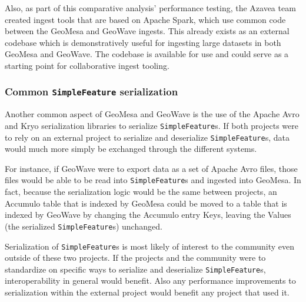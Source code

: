 Also, as part of this comparative analysis' performance testing, the Azavea team created ingest tools that are based on Apache Spark, which use common code between the GeoMesa and GeoWave ingests.
This already exists as an external codebase which is demonstratively useful for ingesting large datasets in both GeoMesa and GeoWave.
The codebase is available for use and could serve as a starting point for collaborative ingest tooling.


\subsubsection{Common \texttt{SimpleFeature} serialization}
\label{sec:conclusions:collaboration:serialization}

Another common aspect of GeoMesa and GeoWave is the use of the Apache Avro and Kryo serialization libraries to serialize \texttt{SimpleFeature}s.
If both projects were to rely on an external project to serialize and deserialize \texttt{SimpleFeature}s, data would much more simply be exchanged through the different systems.

For instance, if GeoWave were to export data as a set of Apache Avro files, those files would be able to be read into \texttt{SimpleFeature}s and ingested into GeoMesa.
In fact, because the serialization logic would be the same between projects, an Accumulo table that is indexed by GeoMesa could be moved to a table that is indexed by GeoWave by changing the Accumulo entry Keys, leaving the Values (the serialized \texttt{SimpleFeature}s) unchanged.

Serialization of \texttt{SimpleFeature}s is most likely of interest to the community even outside of these two projects.
If the projects and the community were to standardize on specific ways to serialize and deserialize \texttt{SimpleFeature}s, interoperability in general would benefit.
Also any performance improvements to serialization within the external project would benefit any project that used it.
